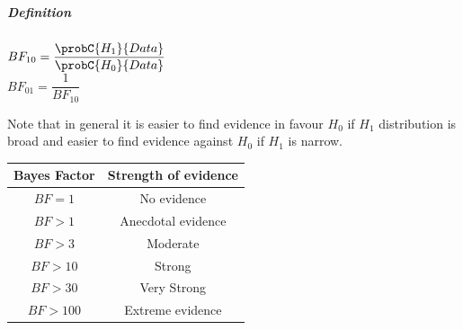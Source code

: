 \subparagraph{Definition}
\begin{center}
	$BF_{10}=\dfrac{\probC{H_{1}}{Data}}{\probC{H_{0}}{Data}}$\\
	$BF_{01}=\dfrac{1}{BF_{10}}$\\
\end{center}
Note that in general it is easier to find evidence in favour $H_{0}$ if $H_{1}$ 
distribution is broad and easier to find evidence against $H_{0}$ if $H_{1}$ is narrow.
\begin{center}
	\begin{tabular}{|c|c|}
		\hline
		\textbf{Bayes Factor} & \textbf{Strength of evidence}\\
		\hline
		$BF=1$ & No evidence \\
		\hline
		$BF>1$ & Anecdotal evidence \\
		\hline
		$BF>3$ & Moderate \\
		\hline
		$BF>10$ & Strong \\
		\hline
		$BF>30$ & Very Strong \\
		\hline
		$BF>100$ & Extreme evidence \\
		\hline
	\end{tabular}
\end{center}

